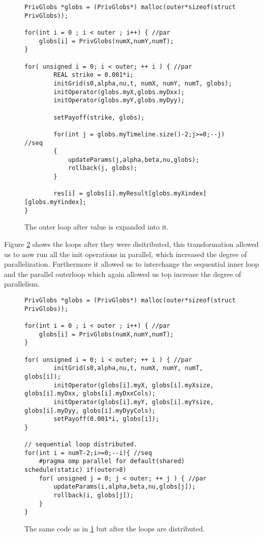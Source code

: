 \begin{figure}[H]
    \begin{lstlisting}
PrivGlobs *globs = (PrivGlobs*) malloc(outer*sizeof(struct PrivGlobs));

for(int i = 0 ; i < outer ; i++) { //par
    globs[i] = PrivGlobs(numX,numY,numT);
}

for( unsigned i = 0; i < outer; ++ i ) { //par
        REAL strike = 0.001*i;
        initGrid(s0,alpha,nu,t, numX, numY, numT, globs);
        initOperator(globs.myX,globs.myDxx);
        initOperator(globs.myY,globs.myDyy);

        setPayoff(strike, globs);

        for(int j = globs.myTimeline.size()-2;j>=0;--j) //seq
        {
            updateParams(j,alpha,beta,nu,globs);
            rollback(j, globs);
        }

        res[i] = globs[i].myResult[globs.myXindex][globs.myYindex];
}
    \end{lstlisting}
    \caption{The outer loop after value is expanded into it.}
    \label{code:arrayexp2}
\end{figure}

Figure \ref{code:arrayexp3} shows the loops after they were disitributed, this
transformation allowed us to now run all the init operations in parallel, which
increased the degree of parallelization. Furthermore it allowed us to
interchange the sequential inner loop and the parallel outerloop which again
allowed us top increase the degree of parallelism.

\begin{figure}[H]
    \begin{lstlisting}
PrivGlobs *globs = (PrivGlobs*) malloc(outer*sizeof(struct PrivGlobs));

for(int i = 0 ; i < outer ; i++) { //par
    globs[i] = PrivGlobs(numX,numY,numT);
}

for( unsigned i = 0; i < outer; ++ i ) { //par
        initGrid(s0,alpha,nu,t, numX, numY, numT, globs[i]);
        initOperator(globs[i].myX, globs[i].myXsize, globs[i].myDxx, globs[i].myDxxCols);
        initOperator(globs[i].myY, globs[i].myYsize, globs[i].myDyy, globs[i].myDyyCols);
        setPayoff(0.001*i, globs[i]);
}

// sequential loop distributed.
for(int i = numT-2;i>=0;--i){ //seq
    #pragma omp parallel for default(shared) schedule(static) if(outer>8)
    for( unsigned j = 0; j < outer; ++ j ) { //par
        updateParams(i,alpha,beta,nu,globs[j]);
        rollback(i, globs[j]);
    }
}
    \end{lstlisting}
    \caption{The same code as in \ref{code:arrayexp2} but after the loops are
    distributed.}
    \label{code:arrayexp3}
\end{figure}

